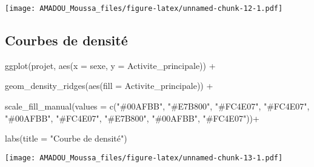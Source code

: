 \documentclass[
  14pt,
]{article}
\newenvironment{Shaded}{\begin{snugshade}}{\end{snugshade}}
\newcommand{\AttributeTok}[1]{\textcolor[rgb]{0.77,0.63,0.00}{#1}}
\newcommand{\FunctionTok}[1]{\textcolor[rgb]{0.00,0.00,0.00}{#1}}
\newcommand{\NormalTok}[1]{#1}
\newcommand{\SpecialCharTok}[1]{\textcolor[rgb]{0.00,0.00,0.00}{#1}}
\newcommand{\StringTok}[1]{\textcolor[rgb]{0.31,0.60,0.02}{#1}}
\begin{document}
\texttt{[image: AMADOU\_Moussa\_files/figure-latex/unnamed-chunk-12-1.pdf]}

\newpage

\hypertarget{courbes-de-densituxe9}{%
\subsection{\texorpdfstring{\textbf{Courbes de densité}\\
}{Courbes de densité }}\label{courbes-de-densituxe9}}

\begin{Shaded}
\begin{Highlighting}[]
\FunctionTok{ggplot}\NormalTok{(projet, }\FunctionTok{aes}\NormalTok{(}\AttributeTok{x =}\NormalTok{ sexe,}
                   \AttributeTok{y =}\NormalTok{ Activite\_principale)) }\SpecialCharTok{+}
  
  \FunctionTok{geom\_density\_ridges}\NormalTok{(}\FunctionTok{aes}\NormalTok{(}\AttributeTok{fill =}\NormalTok{  Activite\_principale)) }\SpecialCharTok{+}
  
  \FunctionTok{scale\_fill\_manual}\NormalTok{(}\AttributeTok{values =} \FunctionTok{c}\NormalTok{(}\StringTok{"\#00AFBB"}\NormalTok{,}
                               \StringTok{"\#E7B800"}\NormalTok{, }
                               \StringTok{"\#FC4E07"}\NormalTok{,}
                               \StringTok{"\#FC4E07"}\NormalTok{,}
                               \StringTok{"\#00AFBB"}\NormalTok{,}
                               \StringTok{"\#FC4E07"}\NormalTok{,}
                               \StringTok{"\#E7B800"}\NormalTok{,}
                               \StringTok{"\#00AFBB"}\NormalTok{,}
                               \StringTok{"\#FC4E07"}\NormalTok{))}\SpecialCharTok{+}
  
  \FunctionTok{labs}\NormalTok{(}\AttributeTok{title =} \StringTok{"Courbe de densité"}\NormalTok{)}
\end{Highlighting}
\end{Shaded}

\texttt{[image: AMADOU\_Moussa\_files/figure-latex/unnamed-chunk-13-1.pdf]}

\newpage
\end{document}
